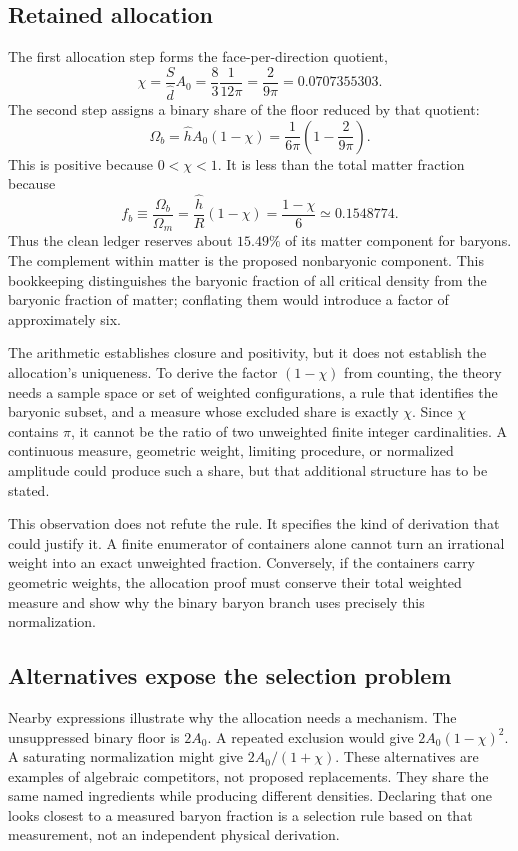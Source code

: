\subsection{Retained allocation}
The first allocation step forms the face-per-direction quotient,
\begin{equation}
 \chi=\frac{S}{\widehat d}A_0
 =\frac{8}{3}\frac1{12\pi}
 =\frac2{9\pi}=0.0707355303.
 \label{c8:chi}
\end{equation}
The second step assigns a binary share of the floor reduced by that quotient:
\begin{equation}
 \Omega_b=\widehat hA_0(1-\chi)
 =\frac1{6\pi}\left(1-\frac2{9\pi}\right).
 \label{c8:baryonclosed}
\end{equation}
This is positive because $0<\chi<1$. It is less than the total matter fraction because
\begin{equation}
 f_b\equiv\frac{\Omega_b}{\Omega_m}
 =\frac{\widehat h}{R}(1-\chi)
 =\frac{1-\chi}{6}\simeq0.1548774.
 \label{c8:fb}
\end{equation}
Thus the clean ledger reserves about $15.49\%$ of its matter component for baryons. The complement within matter is the proposed nonbaryonic component. This bookkeeping distinguishes the baryonic fraction of all critical density from the baryonic fraction of matter; conflating them would introduce a factor of approximately six.

The arithmetic establishes closure and positivity, but it does not establish the allocation's uniqueness. To derive the factor $(1-\chi)$ from counting, the theory needs a sample space or set of weighted configurations, a rule that identifies the baryonic subset, and a measure whose excluded share is exactly $\chi$. Since $\chi$ contains $\pi$, it cannot be the ratio of two unweighted finite integer cardinalities. A continuous measure, geometric weight, limiting procedure, or normalized amplitude could produce such a share, but that additional structure has to be stated.

This observation does not refute the rule. It specifies the kind of derivation that could justify it. A finite enumerator of containers alone cannot turn an irrational weight into an exact unweighted fraction. Conversely, if the containers carry geometric weights, the allocation proof must conserve their total weighted measure and show why the binary baryon branch uses precisely this normalization.

\subsection{Alternatives expose the selection problem}
Nearby expressions illustrate why the allocation needs a mechanism. The unsuppressed binary floor is $2A_0$. A repeated exclusion would give $2A_0(1-\chi)^2$. A saturating normalization might give $2A_0/(1+\chi)$. These alternatives are examples of algebraic competitors, not proposed replacements. They share the same named ingredients while producing different densities. Declaring that one looks closest to a measured baryon fraction is a selection rule based on that measurement, not an independent physical derivation.

